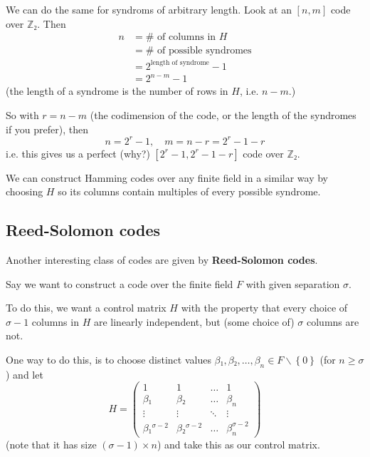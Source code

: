 \documentclass[english]{lbscript}
\begin{document}
We can do the same for syndroms of arbitrary length. Look at an \([n, m]\) code over \(ℤ₂\). Then
\begin{align}
  \label{eq:152}
  n & = \# \text{ of columns in } H       \\
    & = \# \text{ of possible syndromes}  \\
    & = 2^{\text{length of syndrome}} - 1 \\
    & = 2^{n-m} - 1
\end{align}
(the length of a syndrome is the number of rows in \(H\), i.e. \(n-m\).)

So with \(r=n-m\) (the codimension of the code, or the length of the syndromes if you prefer), then
\begin{equation}
  \label{eq:153}
  n=2^{r}-1, \quad m = n-r = 2^{r}-1 -r
\end{equation}
i.e. this gives us a perfect (why?) \([2^{r}-1, 2^{r}-1-r]\) code over \(ℤ₂\).

\begin{remark}{}{}
  We can construct Hamming codes over any finite field in  a similar way by choosing \(H\) so its columns contain multiples of every possible syndrome.
\end{remark}

\subsection{Reed-Solomon codes}
\label{sec:reed-solomon-codes}

Another interesting class of codes are given by \textbf{Reed-Solomon codes}.

Say we want to construct a code over the finite field \(F\) with given separation \(𝜎\).

To do this, we want a control matrix \(H\) with the property that every choice of \(𝜎-1\) columns in \(H\) are linearly independent, but (some choice of) \(𝜎\) columns are not.

One way to do this, is to choose distinct values \(𝛽₁, 𝛽₂, \dots, 𝛽_{n}∈F∖\left\{0 \right\}\) (for \(n≥𝜎\)) and let
\begin{equation}
  \label{eq:154}
  H = \begin{pmatrix}
    1        & 1        & \dots  & 1           \\
    𝛽₁       & 𝛽₂       & \dots  & 𝛽_{n}       \\
    \vdots   & \vdots   & \ddots & \vdots      \\
    𝛽₁^{𝜎-2} & 𝛽₂^{𝜎-2} & \dots  & 𝛽_{n}^{𝜎-2}
  \end{pmatrix}
\end{equation}
(note that it has size \((𝜎-1)×n\)) and take this as our control matrix.
\end{document}
